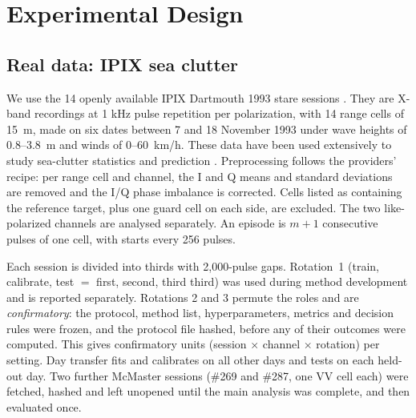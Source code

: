 \section{Experimental Design}
\subsection{Real data: IPIX sea clutter}
We use the 14 openly available IPIX Dartmouth 1993 stare sessions \cite{ipixweb}. They are X-band recordings at 1 kHz pulse repetition per polarization, with 14 range cells of 15~m, made on six dates between 7 and 18 November 1993 under wave heights of 0.8--3.8~m and winds of 0--60~km/h. These data have been used extensively to study sea-clutter statistics and prediction \cite{haykin1995,farina1997,haykin2002}. Preprocessing follows the providers' recipe: per range cell and channel, the I and Q means and standard deviations are removed and the I/Q phase imbalance is corrected. Cells listed as containing the reference target, plus one guard cell on each side, are excluded. The two like-polarized channels are analysed separately. An episode is $m+1$ consecutive pulses of one cell, with starts every 256 pulses.

Each session is divided into thirds with 2,000-pulse gaps. Rotation~1 (train, calibrate, test $=$ first, second, third third) was used during method development and is reported separately. Rotations 2 and 3 permute the roles and are \emph{confirmatory}: the protocol, method list, hyperparameters, metrics and decision rules were frozen, and the protocol file hashed, before any of their outcomes were computed. This gives \NUnitsConf{} confirmatory units (session $\times$ channel $\times$ rotation) per setting. Day transfer fits and calibrates on all other days and tests on each held-out day. Two further McMaster sessions (\#269 and \#287, one VV cell each) were fetched, hashed and left unopened until the main analysis was complete, and then evaluated once.

